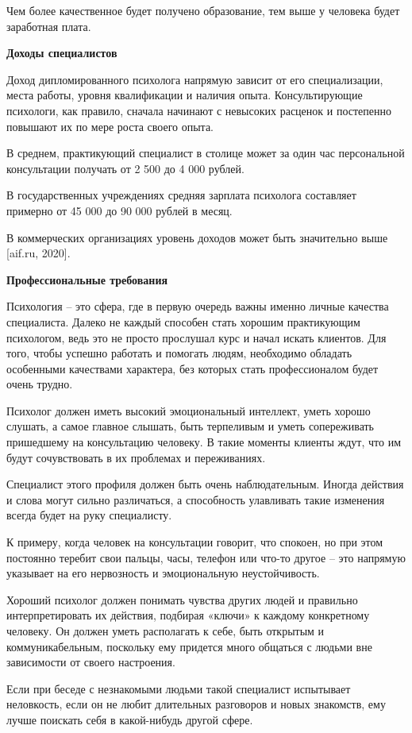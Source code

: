 Чем более качественное будет получено образование, тем выше у человека будет заработная плата.

\textbf{Доходы специалистов}

Доход дипломированного психолога напрямую зависит от его специализации, места работы, уровня квалификации и наличия опыта. Консультирующие психологи, как правило, сначала начинают с невысоких расценок и постепенно повышают их по мере роста своего опыта.

В среднем, практикующий специалист в столице может за один час персональной консультации получать от 2 500 до 4 000 рублей.

В государственных учреждениях средняя зарплата психолога составляет примерно от 45 000 до 90 000 рублей в месяц.

В коммерческих организациях уровень доходов может быть значительно выше [aif.ru, 2020].

\textbf{Профессиональные требования}

Психология – это сфера, где в первую очередь важны именно личные качества специалиста. Далеко не каждый способен стать хорошим практикующим психологом, ведь это не просто прослушал курс и начал искать клиентов. Для того, чтобы успешно работать и помогать людям, необходимо обладать особенными качествами характера, без которых стать профессионалом будет очень трудно.

Психолог должен иметь высокий эмоциональный интеллект, уметь хорошо слушать, а самое главное слышать, быть терпеливым и уметь сопереживать пришедшему на консультацию человеку. В такие моменты клиенты ждут, что им будут сочувствовать в их проблемах и переживаниях.

Специалист этого профиля должен быть очень наблюдательным. Иногда действия и слова могут сильно различаться, а способность улавливать такие изменения всегда будет на руку специалисту.

К примеру, когда человек на консультации говорит, что спокоен, но при этом постоянно теребит свои пальцы, часы, телефон или что-то другое – это напрямую указывает на его нервозность и эмоциональную неустойчивость.

Хороший психолог должен понимать чувства других людей и правильно интерпретировать их действия, подбирая «ключи» к каждому конкретному человеку. Он должен уметь располагать к себе, быть открытым и коммуникабельным, поскольку ему придется много общаться с людьми вне зависимости от своего настроения.

Если при беседе с незнакомыми людьми такой специалист испытывает неловкость, если он не любит длительных разговоров и новых знакомств, ему лучше поискать себя в какой-нибудь другой сфере.

